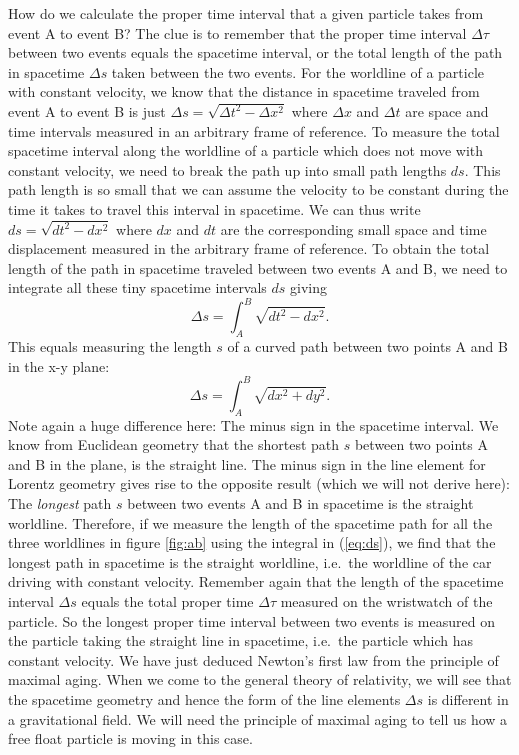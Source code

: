 {\begin{multicols}{2}
How do we calculate the proper time interval that a given particle takes from event A to event B? The clue is to remember that the proper time interval $\Delta\tau$ between two events equals the spacetime interval, or the total length of the path in spacetime $\Delta s$ taken between the two events. For the worldline of a particle with constant velocity, we know that the distance in spacetime traveled from event A to event B is just $\Delta s=\sqrt{\Delta t^2-\Delta x^2}$ where $\Delta x$ and $\Delta t$ are space and time intervals measured in an arbitrary frame of reference. To measure the total spacetime interval along the worldline of a particle which does not move with constant velocity, we need to break the path up into small path lengths $ds$. This path length is so small that we can assume the velocity to be constant during the time it takes to travel this interval in spacetime. We can thus write $ds=\sqrt{dt^2-dx^2}$ where $dx$ and $dt$ are the corresponding small space and time displacement measured in the arbitrary frame of reference. To obtain the total length of the path in spacetime traveled between two events A and B, we need to integrate all these tiny spacetime intervals $ds$ giving
\begin{equation}
\label{eq:ds}
\Delta s=\int_A^B\sqrt{dt^2-dx^2}.
\end{equation}
This equals measuring the length $s$ of a curved path between two points A and B in the x-y plane:
\[
\Delta s=\int_A^B\sqrt{dx^2+dy^2}.
\]
Note again a huge difference here: The minus sign in the spacetime interval. We know from Euclidean geometry that the shortest path $s$ between two points A and B in the plane, is the straight line. The minus sign in the line element for Lorentz geometry gives rise to the opposite result (which we will not derive here): The \emph{longest} path $s$ between two events A and B in spacetime is the straight worldline. Therefore, if we measure the length of the spacetime path for all the three worldlines in figure \ref{fig:ab} using the integral in (\ref{eq:ds}), we find that the longest path in spacetime is the straight worldline, i.e.\ the worldline of the car driving with constant velocity. Remember again that the length of the spacetime interval $\Delta s$ equals the total proper time $\Delta\tau$ measured on the wristwatch of the particle. So the longest proper time interval between two events is measured on the particle taking the straight line in spacetime, i.e.\ the particle which has constant velocity. We have just deduced Newton's first law from the principle of maximal aging. When we come to the general theory of relativity, we will see that the spacetime geometry and hence the form of the line elements $\Delta s$ is different in a gravitational field. We will need the principle of maximal aging to tell us how a free float particle is moving in this case. 


\end{multicols}}
